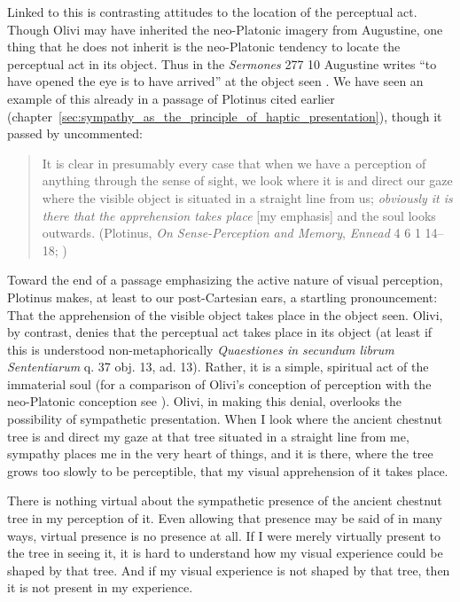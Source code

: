 Linked to this is contrasting attitudes to the location of the perceptual act. Though Olivi may have inherited the neo-Platonic imagery from Augustine, one thing that he does not inherit is the neo-Platonic tendency to locate the perceptual act in its object. Thus in the \emph{Sermones} 277 10 Augustine writes ``to have opened the eye is to have arrived'' at the object seen \citep[82]{ODaly:1987fq}. We have seen an example of this already in a passage of Plotinus cited earlier  (chapter~\ref{sec:sympathy_as_the_principle_of_haptic_presentation}), though it passed by uncommented: 
\begin{quote}
	It is clear in presumably every case that when we have a perception of anything through the sense of sight, we look where it is and direct our gaze where the visible object is situated in a straight line from us; \emph{obviously it is there that the apprehension takes place} [my emphasis] and the soul looks outwards. (Plotinus, \emph{On Sense-Perception and Memory}, \emph{Ennead} 4 6 1 14--18; \citealt[321]{Armstrong:1984aa})
\end{quote}
Toward the end of a passage emphasizing the active nature of visual perception, Plotinus makes, at least to our post-Cartesian ears, a startling pronouncement: That the apprehension of the visible object takes place in the object seen. Olivi, by contrast, denies that the perceptual act takes place in its object (at least if this is understood non-metaphorically \emph{Quaestiones in secundum librum Sententiarum} q. 37 obj. 13, ad. 13). Rather, it is a simple, spiritual act of the immaterial soul (for a comparison of Olivi's conception of perception with the neo-Platonic conception see \citealt[151]{Toivanen:2013ul}). Olivi, in making this denial, overlooks the possibility of sympathetic presentation. When I look where the ancient chestnut tree is and direct my gaze at that tree situated in a straight line from me, sympathy places me in the very heart of things, and it is there, where the tree grows too slowly to be perceptible, that my visual apprehension of it takes place.

There is nothing virtual about the sympathetic presence of the ancient chestnut tree in my perception of it. Even allowing that presence may be said of in many ways, virtual presence is no presence at all. If I were merely virtually present to the tree in seeing it, it is hard to understand how my visual experience could be shaped by that tree. And if my visual experience is not shaped by that tree, then it is not present in my experience.


